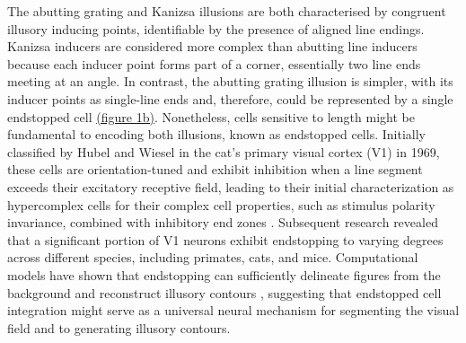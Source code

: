 \documentclass[12pt]{article}
\begin{document}
\bigbreak
The abutting grating and Kanizsa illusions are both characterised by congruent illusory inducing points, identifiable by the presence of aligned line endings. Kanizsa inducers are considered more complex than abutting line inducers because each inducer point forms part of a corner, essentially two line ends meeting at an angle. In contrast, the abutting grating illusion is simpler, with its inducer points as single-line ends and, therefore, could be represented by a single endstopped cell \hyperref[fig:figure_1]{(figure 1b)}.
Nonetheless, cells sensitive to length might be fundamental to encoding both illusions, known as endstopped cells. Initially classified by Hubel and Wiesel in the cat's primary visual cortex (V1) in 1969, these cells are orientation-tuned and exhibit inhibition when a line segment exceeds their excitatory receptive field, leading to their initial characterization as hypercomplex cells for their complex cell properties, such as stimulus polarity invariance, combined with inhibitory end zones \autocite{hubelRECEPTIVEFIELDSFUNCTIONAL1965}. Subsequent research revealed that a significant portion of V1 neurons exhibit endstopping to varying degrees  \autocite{deangelisLengthWidthTuning1994,jonesSurroundSuppressionPrimate2001,sceniakVisualSpatialCharacterization2001} across different species, including primates, cats, and mice. Computational models have shown that endstopping can sufficiently delineate figures from the background and reconstruct illusory contours \autocite{vonderheydtMechanismsContourPerception1989}, suggesting that endstopped cell integration might serve as a universal neural mechanism for segmenting the visual field and to generating illusory contours.
\end{document}
